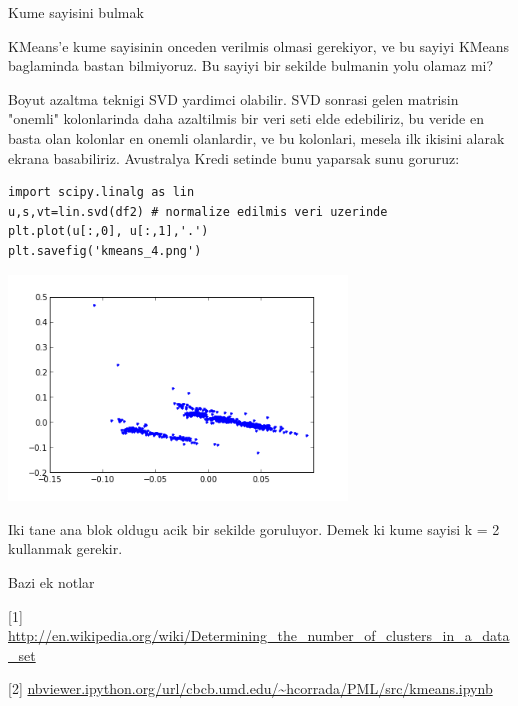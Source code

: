 \documentclass[12pt,fleqn]{article}\usepackage{../common}
\begin{document}
Kume sayisini bulmak

KMeans'e kume sayisinin onceden verilmis olmasi gerekiyor, ve bu
sayiyi KMeans baglaminda bastan bilmiyoruz. Bu sayiyi bir sekilde
bulmanin yolu olamaz mi?

Boyut azaltma teknigi SVD yardimci olabilir. SVD sonrasi gelen
matrisin "onemli" kolonlarinda daha azaltilmis bir veri seti elde
edebiliriz, bu veride en basta olan kolonlar en onemli olanlardir, ve
bu kolonlari, mesela ilk ikisini alarak ekrana basabiliriz. Avustralya
Kredi setinde bunu yaparsak sunu goruruz:

\begin{verbatim}
import scipy.linalg as lin
u,s,vt=lin.svd(df2) # normalize edilmis veri uzerinde
plt.plot(u[:,0], u[:,1],'.')
plt.savefig('kmeans_4.png')
\end{verbatim}

\includegraphics[height=6cm]{kmeans_4.png}

Iki tane ana blok oldugu acik bir sekilde goruluyor. Demek ki kume sayisi
k = 2 kullanmak gerekir. 

Bazi ek notlar

[1] \url{http://en.wikipedia.org/wiki/Determining_the_number_of_clusters_in_a_data_set}

[2] \url{nbviewer.ipython.org/url/cbcb.umd.edu/~hcorrada/PML/src/kmeans.ipynb}
\end{document}
